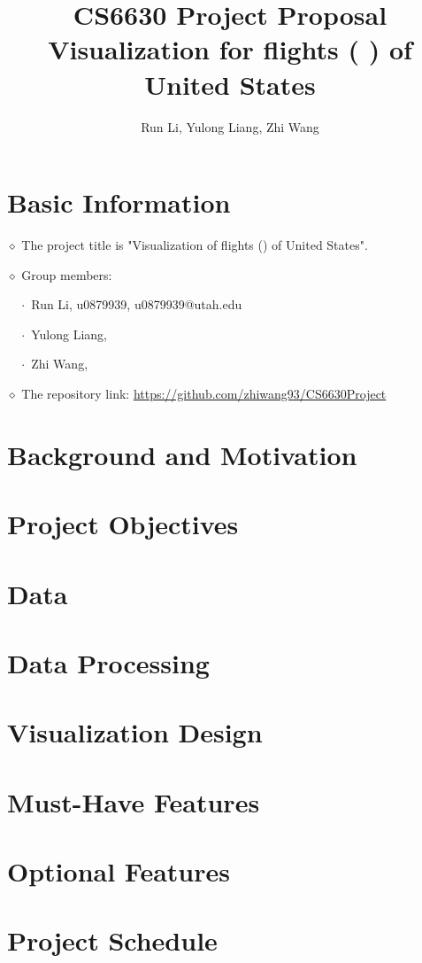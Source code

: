 \documentclass[12pt]{article}
\title{CS6630 Project Proposal\\
       Visualization for flights ( ) of United States}
\author{Run Li, Yulong Liang, Zhi Wang}
\begin{document}
\maketitle

\section{Basic Information}
    $\diamond$ The project title is "Visualization of flights () of United States".

    $\diamond$ Group members:

    $\quad\cdot$ Run Li, u0879939, u0879939@utah.edu

    $\quad\cdot$ Yulong Liang,

    $\quad\cdot$ Zhi Wang,

    $\diamond$ The repository link: \url{https://github.com/zhiwang93/CS6630Project}

\section{Background and Motivation}
\section{Project Objectives}
\section{Data}
\section{Data Processing}
\section{Visualization Design}
\section{Must-Have Features}
\section{Optional Features}
\section{Project Schedule}
    
\end{document}
